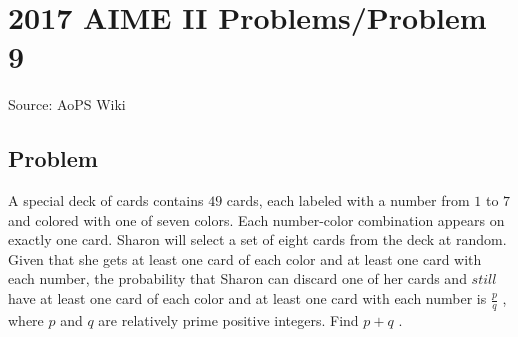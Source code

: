 \documentclass[12pt]{article}
\begin{document}
\section*{{2017 AIME II Problems/Problem 9}}
Source: AoPS Wiki

\subsection*{Problem}
A special deck of cards contains $49$ cards, each labeled with a number from $1$ to $7$ and colored with one of seven colors. Each number-color combination appears on exactly one card. Sharon will select a set of eight cards from the deck at random. Given that she gets at least one card of each color and at least one card with each number, the probability that Sharon can discard one of her cards and $\textit{still}$ have at least one card of each color and at least one card with each number is $\frac{p}{q}$ , where $p$ and $q$ are relatively prime positive integers. Find $p+q$ .
\end{document}
